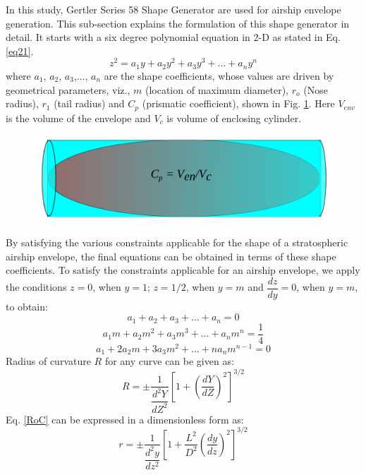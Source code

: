 In this study, Gertler Series 58 Shape Generator are used for airship envelope generation. This sub-section explains the formulation of this shape generator in detail. It starts with a six degree polynomial equation in 2-D as stated in Eq. \ref{eq21}.
\begin{equation}
\label{eq21}
z^2 = a_1y + a_2y^2 + a_3y^3 + ... + a_ny^n	
\end{equation}
where $a_1$, $a_2$, $a_3$,..., $a_n$ are the shape coefficients, whose values are driven by  geometrical parameters, viz., $m$ (location of maximum diameter), $r_o$ (Nose radius), $r_1$ (tail radius) and $C_p$ (prismatic coefficient), shown in Fig. \ref{fig:cp}. Here $ V_{env} $ is the volume of the envelope and $ V_{c} $ is volume of enclosing cylinder.
\begin{figure}[H]
	\centering
	\includegraphics[width=0.7\linewidth]{rnd/c_p_definition.png}
	\label{fig:cp}
\end{figure}
By satisfying the various constraints applicable for the shape of a stratospheric airship envelope, the final equations can be obtained in terms of these shape coefficients. To satisfy the constraints applicable for an airship envelope, we apply the conditions $z = 0$, when $y = 1$; $z = 1/2$, when $y = m$ and $\dfrac{dz}{dy} = 0$, when $y = m$, to obtain:
\begin{equation}
a_1 + a_2 + a_3 + ... + a_n = 0	
\end{equation}
\begin{equation}
a_1m + a_2m^2 + a_3m^3 + ... + a_nm^n = \frac{1}{4}	
\end{equation}
\begin{equation}
a_1 + 2a_2m + 3a_3m^2 + ... + na_nm^{n-1} =0	
\end{equation}
Radius of curvature $R$ for any curve can be given as:
\begin{equation}
R = \pm \dfrac{1}{\dfrac{d^2Y}{dZ^2}}\left[1+\left(\dfrac{dY}{dZ}\right)^2\right]^{3/2}
\label{RoC}	
\end{equation}
Eq. \ref {RoC} can be expressed in a  dimensionless form as:
\begin{equation}
\label{eq24}
r = \pm \dfrac{1}{\dfrac{d^2y}{dz^2}}\left[1+\frac{L^2}{D^2}\left(\dfrac{dy}{dz}\right)^2\right]^{3/2}	
\end{equation}
